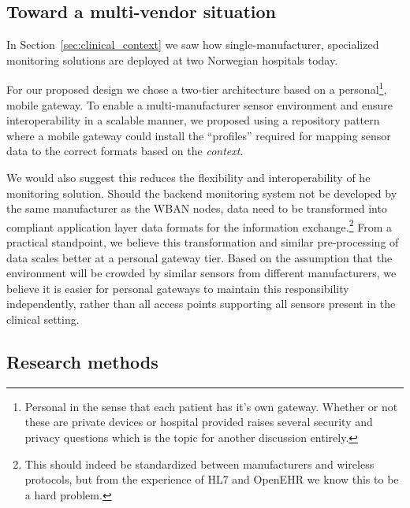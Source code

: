 \subsection{Toward a multi-vendor situation} %
\label{sub:toward_a_multi_vendor_situation}

In Section~\ref{sec:clinical_context} we saw how single-manufacturer, specialized monitoring solutions are deployed at two Norwegian hospitals today. 


For our proposed design we chose a two-tier architecture based on a personal\footnote{ Personal in the sense that each patient has it's own gateway. Whether or not these are private devices or hospital provided raises several security and privacy questions which is the topic for another discussion entirely.}, mobile gateway. To enable a multi-manufacturer sensor environment and ensure interoperability in a scalable manner, we proposed using a repository pattern where a mobile gateway could install the ``profiles'' required for mapping sensor data to the correct formats based on the \emph{context}.

We would also suggest this reduces the flexibility and interoperability of he monitoring solution. Should the backend monitoring system not be developed by the same manufacturer as the WBAN nodes, data need to be transformed into compliant application layer data formats for the information exchange.\footnote{ This should indeed be standardized between manufacturers and wireless protocols, but from the experience of HL7 and OpenEHR we know this to be a hard problem.} From a practical standpoint, we believe this transformation and similar pre-processing of data scales better at a personal gateway tier. Based on the assumption that the environment will be crowded by similar sensors from different manufacturers, we believe it is easier for personal gateways to maintain this responsibility independently, rather than all access points supporting all sensors present in the clinical setting.


\subsection{Research methods} %
\label{ssub:research_methods}

